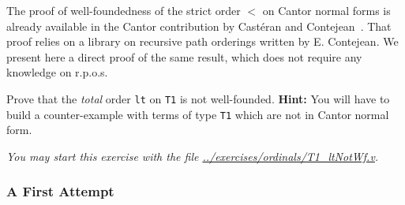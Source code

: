 The proof of well-foundedness of the strict order $<$ on Cantor normal forms is already 
available in the Cantor contribution by Castéran and Contejean~\cite{CantorContrib}. That proof relies on a library on recursive path orderings written by
E. Contejean. We present here  a direct proof of the same result, which does not require any knowledge on r.p.o.s.


\begin{exercise}
Prove that the \emph{total} order \texttt{lt} on \texttt{T1} is not well-founded. 
\textbf{Hint:}  You will have to build a counter-example with terms of type \texttt{T1}
which are not in Cantor normal form.

\emph{You may start this exercise with the file
\url{../exercises/ordinals/T1_ltNotWf.v}.}
\end{exercise}



  

 




\subsubsection{A First Attempt}
\label{sec:orgheadline77}

